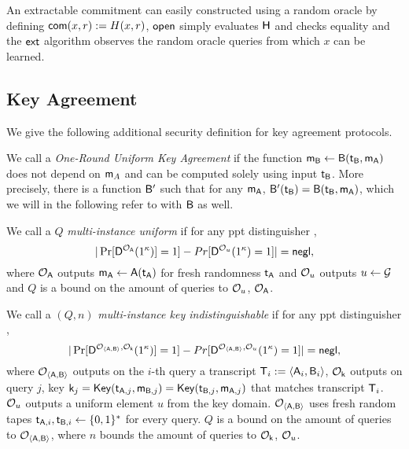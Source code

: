 An extractable commitment can easily constructed using a random oracle by defining $\mathsf{com}(x,r):=H(x,r)$, $\mathsf{open}$ simply evaluates $\mathsf{H}$ and checks equality and the $\mathsf{ext}$ algorithm observes the random oracle queries from which $x$ can be learned.

\subsection{Key Agreement}\label{sec:addKA}
We give the following additional security definition for key agreement protocols.

\begin{definition}
We call a \UKA \emph{One-Round Uniform Key Agreement} if the function $\mathsf{m}_{\mathsf{B}}\leftarrow\mathsf{B}(\mathsf{t}_{\mathsf{B}},\mathsf{m}_\mathsf{A})$ does not depend on $\mathsf{m}_A$ and can be computed solely using input $\mathsf{t}_{\mathsf{B}}$. More precisely, there is a function $\mathsf{B}'$ such that for any $\mathsf{m}_{\mathsf{A}}$, $\mathsf{B}'(\mathsf{t}_{\mathsf{B}})=\mathsf{B}(\mathsf{t}_{\mathsf{B}},\mathsf{m}_{\mathsf{A}})$, which we will in the following refer to with $\mathsf{B}$ as well. 
\end{definition}

\begin{definition}
We call a \UKA $Q$ \emph{multi-instance uniform} if for any ppt distinguisher \D,
$$
|\Pr[\mathsf D^{\mathcal{O}_{\mathsf{A}}}(1^{\kappa})]=1]-Pr[\mathsf D^{\mathcal{O}_{u}}(1^{\kappa})=1]|=\mathsf{negl},
$$
where $\mathcal{O}_{\mathsf{A}}$ outputs $\mathsf{m}_\mathsf{A}\leftarrow\mathsf{A}(\mathsf{t}_\mathsf{A})$ for fresh randomness $\mathsf{t}_\mathsf{A}$ and $\mathcal{O}_u$ outputs $u\leftarrow\mathcal{G}$ and $Q$ is a bound on the amount of queries to $\mathcal{O}_{u}$, $\mathcal{O}_{\mathsf{A}}$.
\end{definition}



\begin{definition}
We call a \UKA $(Q,n)$ \emph{multi-instance key indistinguishable} if for any ppt distinguisher \D,
$$
|\Pr[\mathsf D^{\mathcal{O}_{\langle \mathsf{A},\mathsf{B}\rangle}, \mathcal{O}_{\mathsf{k}}}(1^{\kappa})]=1]-Pr[\mathsf D^{\mathcal{O}_{\langle \mathsf{A},\mathsf{B}\rangle},\mathcal{O}_{u}}(1^{\kappa})=1]|=\mathsf{negl},
$$
where $\mathcal{O}_{\langle \mathsf{A},\mathsf{B}\rangle}$ outputs on the $i$-th query a transcript $\mathsf{T}_i:=\langle \mathsf{A}_i,\mathsf{B}_i\rangle$, $\mathcal{O}_{\mathsf{k}}$ outputs on query $j$, key $\mathsf{k}_j=\mathsf{Key}(\mathsf{t}_{\mathsf{A},j},\mathsf{m}_{\mathsf{B},j})=\mathsf{Key}(\mathsf{t}_{\mathsf{B},j},\mathsf{m}_{\mathsf{A},j})$ that matches transcript $\mathsf{T}_i$. $\mathcal{O}_u$ outputs a uniform element $u$ from the key domain. $\mathcal{O}_{\langle \mathsf{A},\mathsf{B}\rangle}$ uses fresh random tapes $\mathsf{t}_{\mathsf{A},i},\mathsf{t}_{\mathsf{B},i}\leftarrow\{0,1\}^*$ for every query. $Q$ is a bound on the amount of queries to $\mathcal{O}_{\langle \mathsf{A},\mathsf{B}\rangle}$, where $n$ bounds the amount of queries to $\mathcal{O}_{\mathsf{k}}$, $\mathcal{O}_{u}$. 
\end{definition}

